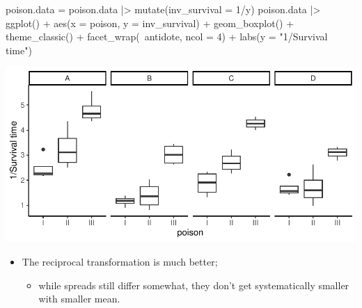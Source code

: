 \documentclass[a4paper]{article}
\begin{document}
\begin{Schunk}
\begin{Sinput}
poison.data = poison.data |> 
  mutate(inv_survival = 1/y)
poison.data |> ggplot() + 
  aes(x = poison, y = inv_survival) + 
  geom_boxplot() + 
  theme_classic() + 
  facet_wrap(~antidote, ncol = 4) + 
  labs(y = "1/Survival time")
\end{Sinput}


{\centering \includegraphics[width=\maxwidth]{figure/listings-unnamed-chunk-304-1} 

}

\end{Schunk}
\begin{itemize}
	\item The reciprocal transformation is much better;
	\begin{itemize}
		\item while spreads still differ somewhat, they don't get systematically smaller with smaller mean.
	\end{itemize}
\end{itemize}
\end{document}
